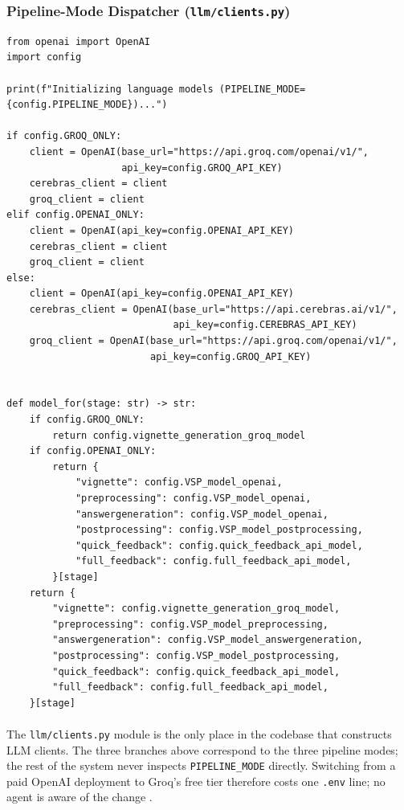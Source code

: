 \documentclass{article}
\begin{document}
\subsubsection{Pipeline-Mode Dispatcher (\texttt{llm/clients.py})}

\begin{lstlisting}[style=codeblock]
from openai import OpenAI
import config

print(f"Initializing language models (PIPELINE_MODE={config.PIPELINE_MODE})...")

if config.GROQ_ONLY:
    client = OpenAI(base_url="https://api.groq.com/openai/v1/",
                    api_key=config.GROQ_API_KEY)
    cerebras_client = client
    groq_client = client
elif config.OPENAI_ONLY:
    client = OpenAI(api_key=config.OPENAI_API_KEY)
    cerebras_client = client
    groq_client = client
else:
    client = OpenAI(api_key=config.OPENAI_API_KEY)
    cerebras_client = OpenAI(base_url="https://api.cerebras.ai/v1/",
                             api_key=config.CEREBRAS_API_KEY)
    groq_client = OpenAI(base_url="https://api.groq.com/openai/v1/",
                         api_key=config.GROQ_API_KEY)


def model_for(stage: str) -> str:
    if config.GROQ_ONLY:
        return config.vignette_generation_groq_model
    if config.OPENAI_ONLY:
        return {
            "vignette": config.VSP_model_openai,
            "preprocessing": config.VSP_model_openai,
            "answergeneration": config.VSP_model_openai,
            "postprocessing": config.VSP_model_postprocessing,
            "quick_feedback": config.quick_feedback_api_model,
            "full_feedback": config.full_feedback_api_model,
        }[stage]
    return {
        "vignette": config.vignette_generation_groq_model,
        "preprocessing": config.VSP_model_preprocessing,
        "answergeneration": config.VSP_model_answergeneration,
        "postprocessing": config.VSP_model_postprocessing,
        "quick_feedback": config.quick_feedback_api_model,
        "full_feedback": config.full_feedback_api_model,
    }[stage]
\end{lstlisting}

\paragraph{}
The \texttt{llm/clients.py} module is the only place in the codebase that constructs LLM clients. The three branches above correspond to the three pipeline modes; the rest of the system never inspects \texttt{PIPELINE\_MODE} directly. Switching from a paid OpenAI deployment to Groq's free tier therefore costs one \texttt{.env} line; no agent is aware of the change \cite{Kulkarni2023TheEO}.
\end{document}
